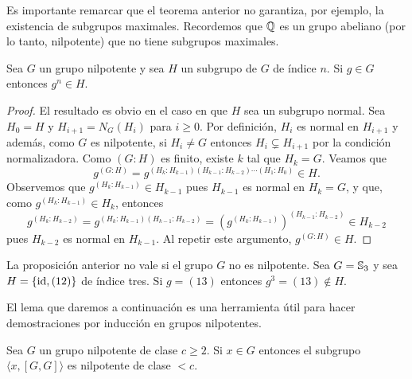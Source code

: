 Es importante remarcar que el teorema anterior no garantiza, por ejemplo, la existencia de subgrupos maximales.
Recordemos que $\mathbb{Q}$ es un grupo abeliano (por lo tanto, nilpotente) que no tiene subgrupos maximales. 

\begin{proposition}
	\label{proposition:g^n}
	Sea $G$ un grupo nilpotente y sea $H$ un subgrupo de $G$ de índice $n$. Si
	$g\in G$ entonces $g^n\in H$.
\end{proposition}


\begin{proof}
	El resultado es obvio en el caso en que $H$ sea un subgrupo normal.  Sea
	$H_0=H$ y $H_{i+1}=N_G(H_i)$ para $i\geq0$. Por definición, $H_{i}$ es
	normal en $H_{i+1}$ y además, como $G$ es nilpotente, si $H_i\ne G$
	entonces $H_i\subsetneq H_{i+1}$ por la condición normalizadora. 
	Como $(G:H)$ es finito, existe $k$ tal que $H_k=G$. Veamos que 
	\[
		g^{(G:H)}=g^{(H_k:H_{k-1})(H_{k-1}:H_{k-2})\cdots (H_1:H_0)}\in H.
	\]
	Observemos que $g^{(H_k:H_{k-1})}\in H_{k-1}$ pues $H_{k-1}$ es normal en $H_k=G$, y que, como 
	$g^{(H_k:H_{k-1})}\in H_k$, entonces 
	\[
	g^{(H_k:H_{k-2})}=g^{(H_k:H_{k-1})(H_{k-1}:H_{k-2})}=\left(g^{(H_k:H_{k-1})}\right)^{(H_{k-1}:H_{k-2})}\in H_{k-2}
	\]
	pues $H_{k-2}$ es normal en $H_{k-1}$. Al repetir este argumento, $g^{(G:H)}\in H$. 
\end{proof}

\begin{example}
	La proposición anterior no vale si el grupo $G$ no es
	nilpotente. Sea $G=\mathbb{S}_3$ y sea $H=\{\operatorname{id},(12)\}$ de índice tres.  Si
	$g=(13)$ entonces $g^{3}=(13)\not\in H$.
\end{example}

El lema que daremos a continuación es una herramienta útil para hacer demostraciones por inducción
en grupos nilpotentes. 

\begin{lemma}
	\label{lemma:a[GG]}
	Sea $G$ un grupo nilpotente de clase $c\geq2$. Si $x\in G$ entonces el subgrupo 
	$\langle x,[G,G]\rangle$ es nilpotente de clase $<c$.
\end{lemma}

